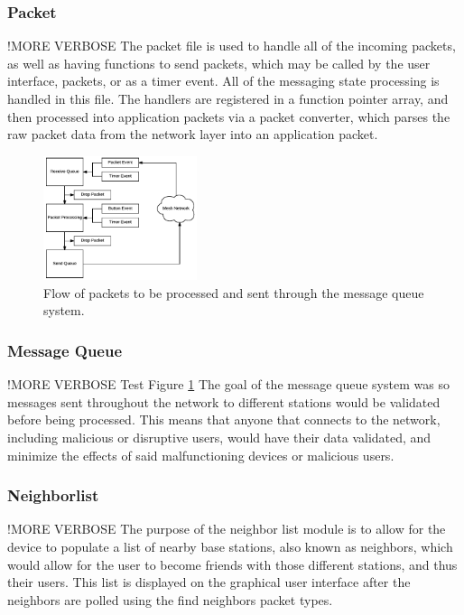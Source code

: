 \documentclass[journal,compsoc]{IEEEtran}
\begin{document}
\subsubsection{Packet} 
!MORE VERBOSE\newline
The packet file is used to handle all of the incoming packets, as well as having functions to send packets, which may be called by the user interface, packets, or as a timer event. All of the messaging state processing is handled in this file. The handlers are registered in a function pointer array, and then processed into application packets via a packet converter, which parses the raw packet data from the network layer into an application packet.

\begin{figure}[ht] 	%
\centering
\includegraphics[width=0.4\textwidth]{MessageQueueFlowchart.png}
\caption{ \space Flow of packets to be processed and sent through the message queue system.}
\label{Message Queue Flowchart}
\end{figure}

\subsubsection{Message Queue} 
!MORE VERBOSE\newline
Test Figure \ref{Message Queue Flowchart}
The goal of the message queue system was so messages sent throughout the network to different stations would be validated before being processed. This means that anyone that connects to the network, including malicious or disruptive users, would have their data validated, and minimize the effects of said malfunctioning devices or malicious users.

\subsubsection{Neighborlist} 
!MORE VERBOSE\newline
The purpose of the neighbor list module is to allow for the device to populate a list of nearby base stations, also known as neighbors, which would allow for the user to become friends with those different stations, and thus their users. This list is displayed on the graphical user interface after the neighbors are polled using the find neighbors packet types. 
\end{document}
